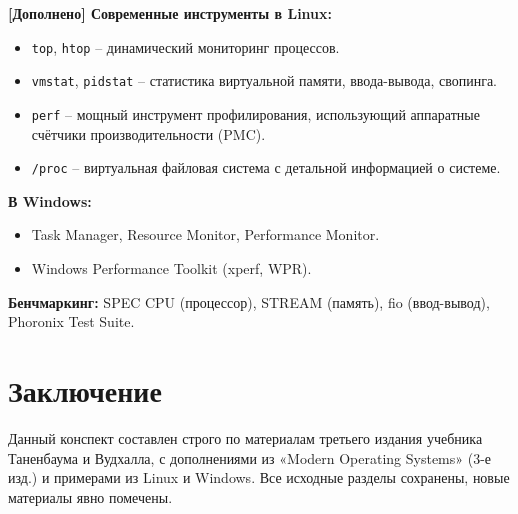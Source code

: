 \documentclass[a4paper,12pt]{article}
\begin{document}
\textbf{[Дополнено] Современные инструменты в Linux:}
\begin{itemize}
    \item \texttt{top}, \texttt{htop} – динамический мониторинг процессов.
    \item \texttt{vmstat}, \texttt{pidstat} – статистика виртуальной памяти, ввода-вывода, свопинга.
    \item \texttt{perf} – мощный инструмент профилирования, использующий аппаратные счётчики производительности (PMC).
    \item \texttt{/proc} – виртуальная файловая система с детальной информацией о системе.
\end{itemize}
\textbf{В Windows:}
\begin{itemize}
    \item Task Manager, Resource Monitor, Performance Monitor.
    \item Windows Performance Toolkit (xperf, WPR).
\end{itemize}
\textbf{Бенчмаркинг:} SPEC CPU (процессор), STREAM (память), fio (ввод-вывод), Phoronix Test Suite.

\section*{Заключение}
Данный конспект составлен строго по материалам третьего издания учебника Таненбаума и Вудхалла, с дополнениями из «Modern Operating Systems» (3-е изд.) и примерами из Linux и Windows. Все исходные разделы сохранены, новые материалы явно помечены.
\end{document}
